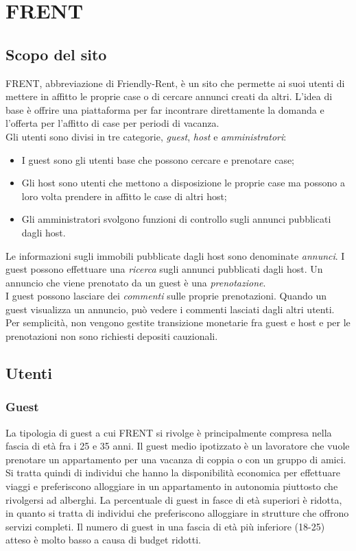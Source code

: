 \documentclass[1_relazione.tex]{subfiles}
\begin{document}
\section{FRENT}

\subsection{Scopo del sito}
FRENT, abbreviazione di Friendly-Rent, è un sito che permette ai suoi utenti di mettere in affitto le proprie case o di cercare annunci creati da altri. L'idea di base è offrire una piattaforma per far incontrare direttamente la domanda e l'offerta per l'affitto di case per periodi di vacanza. \\
Gli utenti sono divisi in tre categorie,  \textit{guest}, \textit{host} e \textit{amministratori}:
\begin{itemize}
 \item I guest sono gli utenti base che possono cercare e prenotare case;
 \item Gli host sono utenti che mettono a disposizione le proprie case ma possono a loro volta prendere in affitto le case di altri host;
 \item Gli amministratori svolgono funzioni di controllo sugli annunci pubblicati dagli host.
\end{itemize}
Le informazioni sugli immobili pubblicate dagli host sono denominate \textit{annunci}. I guest possono effettuare una \textit{ricerca} sugli annunci pubblicati dagli host. Un annuncio che viene prenotato da un guest è una \textit{prenotazione}. \\
I guest possono lasciare dei \textit{commenti} sulle proprie prenotazioni. Quando un guest visualizza un annuncio, può vedere i commenti lasciati dagli altri utenti. \\
Per semplicità, non vengono gestite transizione monetarie fra guest e host e per le prenotazioni non sono richiesti depositi cauzionali. 

\subsection{Utenti}

\subsubsection{Guest} 

La tipologia di guest a cui FRENT si rivolge è principalmente compresa nella fascia di età fra i 25 e 35 anni. Il guest medio ipotizzato è un lavoratore che vuole prenotare un appartamento per una vacanza di coppia o con un gruppo di amici. Si tratta quindi di individui che hanno la disponibilità economica per effettuare viaggi e preferiscono alloggiare in un appartamento in autonomia piuttosto che rivolgersi ad alberghi. La percentuale di guest in fasce di età superiori è ridotta, in quanto si tratta di individui che preferiscono alloggiare in strutture che offrono servizi completi.  Il numero di guest in una fascia di età più inferiore (18-25) atteso è molto basso a causa di budget ridotti.   \\
\end{document}
